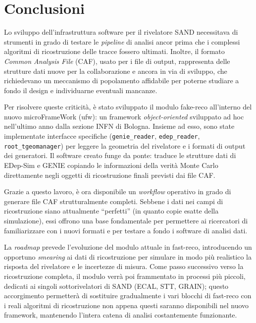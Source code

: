 \documentclass[main.tex]{subfiles}
\begin{document}
\chapter*{Conclusioni}
  Lo sviluppo dell'infrastruttura software
  per il rivelatore SAND necessitava di strumenti in grado di testare le
  \textit{pipeline} di analisi ancor prima che i complessi algoritmi di
  ricostruzione delle tracce fossero ultimati.
  Inoltre, il formato \textit{Common Analysis File} (CAF), usato per i file
  di output, rappresenta delle strutture dati nuove per la
  collaborazione e ancora in via di sviluppo, che richiedevano un meccanismo di
  popolamento affidabile per poterne studiare a fondo il design e
  individuarne eventuali mancanze.

  Per risolvere queste criticità, è stato sviluppato il modulo
  fake-reco all'interno del nuovo microFrameWork (ufw):
  un framework \textit{object-oriented} sviluppato ad hoc nell'ultimo anno
  dalla sezione INFN di Bologna.
  Insieme ad esso, sono state implementate interfacce specifiche
  (\texttt{genie\_reader}, \texttt{edep\_reader}, \texttt{root\_tgeomanager})
  per leggere la geometria del rivelatore e i formati di output dei generatori.
  Il software creato funge da ponte: traduce le strutture dati di EDep-Sim e
  GENIE copiando le informazioni della verità Monte Carlo direttamente negli
  oggetti di ricostruzione finali previsti dai file CAF\@.

  Grazie a questo lavoro, è ora disponibile un \textit{workflow} operativo in
  grado di generare file CAF strutturalmente completi.
  Sebbene i dati nei campi di ricostruzione siano attualmente ``perfetti'' (in
  quanto copie esatte della simulazione), essi offrono una base fondamentale per
  permettere ai ricercatori di familiarizzare con i nuovi formati e per testare
  a fondo i software di analisi dati.

  La \textit{roadmap} prevede l'evoluzione del modulo attuale in fast-reco,
  introducendo un opportuno \textit{smearing} ai dati di ricostruzione per
  simulare in modo più realistico la risposta del rivelatore e le incertezze di
  misura.
  Come passo successivo verso la ricostruzione completa, il modulo verrà poi
  frammentato in processi più piccoli, dedicati ai singoli sottorivelatori di
  SAND (ECAL, STT, GRAIN); questo accorgimento permetterà di sostituire
  gradualmente i vari blocchi di fast-reco con i reali algoritmi di
  ricostruzione non appena questi saranno disponibili nel nuovo framework,
  mantenendo l'intera catena di analisi costantemente funzionante.
\end{document}
